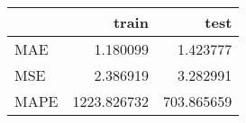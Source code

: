 \begin{tabular}{lrr}
\toprule
{} &        train &        test \\
\midrule
MAE  &     1.180099 &    1.423777 \\
MSE  &     2.386919 &    3.282991 \\
MAPE &  1223.826732 &  703.865659 \\
\bottomrule
\end{tabular}
